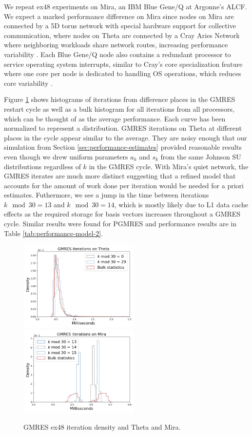 \documentclass[sigconf]{acmart}
\begin{document}
We repeat ex48 experiments on Mira, an IBM Blue Gene/Q \cite{kumaran2016introduction} at Argonne's ALCF.  
We expect a marked performance difference on Mira since 
nodes on Mira are connected by a 5D torus network with special hardware support for collective communication, 
where nodes on Theta are connected by a Cray Aries Network where neighboring workloads share network routes, increasing performance variability \cite{groves2017understanding}. 
Each Blue Gene/Q node also contains a redundant processor to service operating system interrupts, similar to Cray's core specialization feature where one core per node is dedicated to handling OS operations, which reduces core variability \cite{chunduri2017run}.


Figure \ref{fig:mira} shows histograms of iterations from difference places in the GMRES restart cycle as well as a bulk histogram for all iterations from all processors, which can be thought of as the average performance. Each curve has been normalized to represent a distribution.  
GMRES iterations on Theta at different places in the cycle appear similar to the average. They are noisy enough that our simulation from Section \ref{sec:performance-estimates} provided reasonable results even though we drew uniform parameters $a_k$ and $s_k$ from the same Johnson SU distributions regardless of $k$ in the GMRES cycle. 
With Mira's quiet network, the GMRES iterates are much more distinct suggesting that a refined model that accounts for the amount of work done per iteration would be needed for a priori estimates.
Futhermore, we see a jump in the time between iterations $k \mod 30 = 13$ and $k \mod 30 = 14$, which is mostly likely due to L1 data cache effects as the required storage for basis vectors increases throughout a GMRES cycle. 
Similar results were found for PGMRES and performance results are in Table \ref{tab:performance-model-2}.




\begin{figure}
\centering
\includegraphics[width=6cm]{../plots/GMRES_ex48_8192_1000000__bulk_statistics_with_k_mod_30_.png}
\includegraphics[width=6cm]{../plots/GMRES_MIRA_ex48_8192_1000000__bulk_statistics_with_k_mod_30_.png}
\caption{GMRES ex48 iteration density and Theta and Mira.}  \label{fig:mira}
\end{figure}
\end{document}
